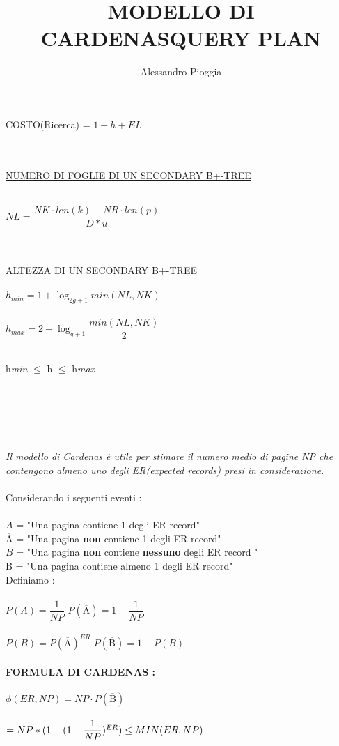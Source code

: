 \documentclass[a4paper,12pt]{article}
\newcommand{\Anegato}{\overline{\text{A}}}
\newcommand{\Bnegato}{\overline{\text{B}}}
\begin{document}
\begin{titlepage}
	\centerline{{\Large COSTO(Ricerca) = ${1 - h + EL}$}} \\ \\
	\underline{NUMERO DI FOGLIE DI UN SECONDARY B+-TREE} \\ \\
	\centerline{${NL = \dfrac{NK \cdot len(k) + NR \cdot len(p)}{D * u}}$}  \\ \\
	\underline{ALTEZZA DI UN SECONDARY B+-TREE} \\ \\
	${h_{min} = 1 + \log_{2g+1}min(NL,NK)}$ \\ \\
	${h_{max} = 2 + \log_{g+1} \dfrac{min(NL, NK)}{2}}$ \\ \\
	\centerline{{\Large h\textit{min} ${\leq}$ h ${\leq}$ h\textit{max}}} \\ \\
	\end{titlepage}
	\begin{titlepage}
	\title{{\huge \textbf{MODELLO DI CARDENAS}}}
	\maketitle\\\\
	\textit{Il modello di Cardenas è utile per stimare il numero medio di pagine NP che contengono almeno uno degli ER(expected records) presi in considerazione.} \\ \\
	Considerando i seguenti eventi : \\ \\
	${A}$ = "Una pagina contiene 1 degli ER record" \\
	${\Anegato}$ = "Una pagina \textbf{non} contiene 1 degli ER record" \\
	${B}$ = "Una pagina \textbf{non} contiene \textbf{nessuno} degli ER record " \\
	${\Bnegato}$ = "Una pagina contiene almeno 1 degli ER record" \\ 		
	Definiamo : \\ \\
	${P(A) = \dfrac{1}{NP} }$\space \space \space \space \space \space \space \space \space \space \space
	${P(\Anegato) = 1 - \dfrac{1}{NP}}$ \\ \\
	${P(B) = P(\Anegato)^{ER}}$ \space \space \space \space \space
	${P(\Bnegato) = 1 - P(B)}$ \\ \\
	\textbf{FORMULA DI CARDENAS :} \\ \\
	${\phi(ER,NP) = NP \cdot P(\Bnegato)}$ \\ \\
	${= NP * (1 - (1 - \dfrac{1}{NP})^{ER}) \space \leq \space MIN(ER, NP)}$
	\end{titlepage}
	\begin{titlepage}
	\title{{\huge \textbf{QUERY PLAN}}}
	\maketitle \\ \\
	\end{titlepage}
	\author{Alessandro Pioggia}
\end{document}
